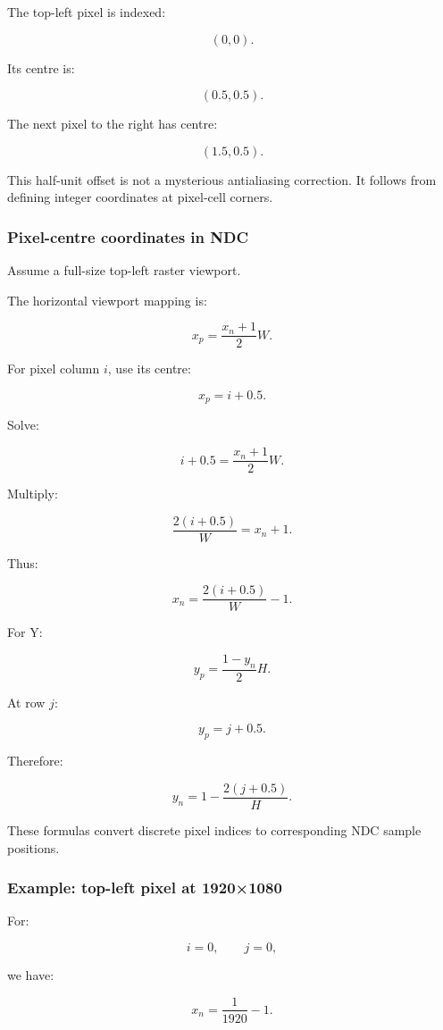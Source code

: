 The top-left pixel is indexed:

\[
 (0,0).
\]

Its centre is:

\[
 \boxed{(0.5,0.5)}.
\]

The next pixel to the right has centre:

\[
 (1.5,0.5).
\]

This half-unit offset is not a mysterious antialiasing correction. It follows from defining integer coordinates at pixel-cell corners.

\subsubsection{Pixel-centre coordinates in NDC}\label{pixel-centre-coordinates-in-ndc}

Assume a full-size top-left raster viewport.

The horizontal viewport mapping is:

\[
 x_p=\frac{x_n+1}{2}W.
\]

For pixel column \(i\), use its centre:

\[
 x_p=i+0.5.
\]

Solve:

\[
 i+0.5=\frac{x_n+1}{2}W.
\]

Multiply:

\[
 \frac{2(i+0.5)}W=x_n+1.
\]

Thus:

\[
 \boxed{ x_n=\frac{2(i+0.5)}W-1 }.
\]

For Y:

\[
 y_p=\frac{1-y_n}{2}H.
\]

At row \(j\):

\[
 y_p=j+0.5.
\]

Therefore:

\[
 \boxed{ y_n=1-\frac{2(j+0.5)}H }.
\]

These formulas convert discrete pixel indices to corresponding NDC sample positions.

\subsubsection{Example: top-left pixel at 1920×1080}\label{example-top-left-pixel-at-19201080}

For:

\[
 i=0,\qquad j=0,
\]

we have:

\[
 x_n=\frac1{1920}-1.
\]

